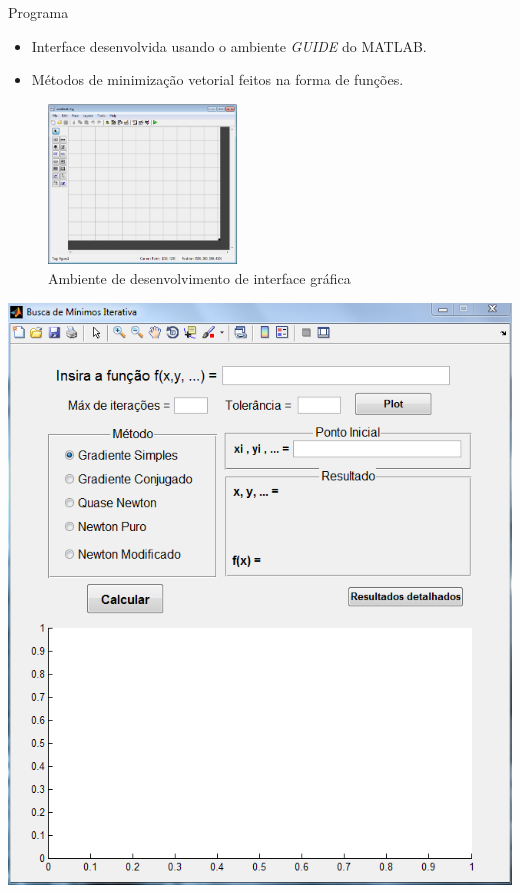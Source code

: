 \begin{frame}{Programa}
	\begin{block}{}
		\begin{itemize}
			\item Interface desenvolvida usando o ambiente \textit{GUIDE} do MATLAB.
			\vspace{1mm}
			\item Métodos de minimização vetorial feitos na forma de funções.
		\end{itemize}
		\vspace{-3mm}
		\begin{figure}[H]
			\begin{center}
				\includegraphics[width=5cm]{GUIDE}   
				\vspace{-0.15cm}
				\caption{Ambiente de desenvolvimento de interface gráfica}
				\label{fig:GUIDE}
			\end{center}
		\end{figure}
		
	\end{block}
\end{frame}
\begin{frame}{}
	\vspace{0mm}
	\hspace{4mm}
	\includegraphics[scale=0.55]{GUI}
\end{frame}